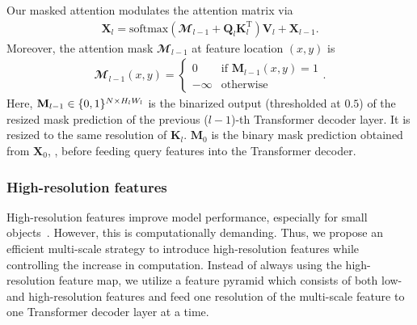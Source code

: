 Our masked attention modulates the attention matrix via
\begin{align}
  \mathbf{X}_{l} = \text{softmax}(\mathbfcal{M}_{l-1} + \mathbf{Q}_{l}\mathbf{K}^{\text{T}}_{l})\mathbf{V}_{l} + \mathbf{X}_{l-1}.
\end{align}
Moreover, the attention mask $\mathbfcal{M}_{l-1}$ at feature location $(x, y)$ is
\begin{align}
\mathbfcal{M}_{l-1}(x, y) = \left\{\begin{array}{ll}
  0  & \text{if~} \mathbf{M}_{l-1}(x,y)=1 \\
    -\infty & \text{otherwise}
\end{array}\right..
\end{align}
Here, $\mathbf{M}_{l-1} \in \{0,1\}^{N \times H_{l}W_{l}}$ is the binarized output (thresholded at $0.5$) of the resized mask prediction of the previous ($l-1$)-th Transformer decoder layer. It is resized to the same resolution of $\mathbf{K}_{l}$. $\mathbf{M}_{0}$ is the binary mask prediction obtained from  $\mathbf{X}_{0}$, \ie, before feeding query features into the Transformer decoder.

















\vspace{-2mm}
\subsubsection{High-resolution features}
\label{sec:method:arch:transformer_decoder:ms_feat}


High-resolution features improve model performance, especially for small objects~\cite{detr}. However, this is computationally demanding. Thus, we propose an efficient multi-scale strategy to introduce high-resolution features while controlling the increase in computation. Instead of always using the high-resolution feature map, we utilize a feature pyramid which consists of both low- and high-resolution features and feed one resolution of the multi-scale feature to one Transformer decoder layer at a time.


